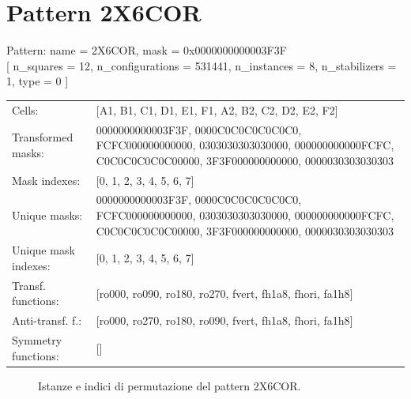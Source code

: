 \newpage

\section{Pattern 2X6COR}

\begin{tcolorbox}[sharp corners, fontupper=\ttfamily\small, colback=white]
  \noindent Pattern: name = 2X6COR, mask = 0x0000000000003F3F\\
  {[} n\_squares = 12, n\_configurations = 531441,
  n\_instances = 8, n\_stabilizers = 1, type = 0 { ]}\\[1.0ex]
  \begin{tabularx}{\textwidth}{@{} p{3.5cm} X @{}}
    Cells:               & {[}A1, B1, C1, D1, E1, F1, A2, B2, C2, D2, E2, F2{]}\\[0.5ex]
    Transformed masks:   & 0000000000003F3F, 0000C0C0C0C0C0C0, FCFC000000000000, 0303030303030000, 000000000000FCFC, C0C0C0C0C0C00000, 3F3F000000000000, 0000030303030303\\[0.5ex]
    Mask indexes:        & {[}0, 1, 2, 3, 4, 5, 6, 7{]}\\[0.5ex]
    Unique masks:        & 0000000000003F3F, 0000C0C0C0C0C0C0, FCFC000000000000, 0303030303030000, 000000000000FCFC, C0C0C0C0C0C00000, 3F3F000000000000, 0000030303030303\\[0.5ex]
    Unique mask indexes: & {[}0, 1, 2, 3, 4, 5, 6, 7{]}\\[0.5ex]
    Transf. functions:   & {[}ro000, ro090, ro180, ro270, fvert, fh1a8, fhori, fa1h8{]}\\[0.5ex]
    Anti-transf. f.:     & {[}ro000, ro270, ro180, ro090, fvert, fh1a8, fhori, fa1h8{]}\\[0.5ex]
    Symmetry functions:  & {[}{]}\\[0.5ex]
  \end{tabularx}
\end{tcolorbox}

\begin{figure}[htbp]
  \centering
   \hfill
   \hfill
   \hfill
  \vspace{0.3cm}
   \hfill
   \hfill
   \hfill
  \caption{Istanze e indici di permutazione del pattern 2X6COR.}
\end{figure}

